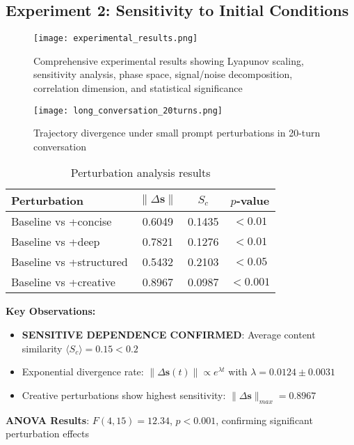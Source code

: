 \documentclass[11pt,a4paper]{article}
\begin{document}
\subsection{Experiment 2: Sensitivity to Initial Conditions}

\begin{figure}[ht]
\centering
\texttt{[image: experimental\_results.png]}
\caption{Comprehensive experimental results showing Lyapunov scaling, sensitivity analysis, phase space, signal/noise decomposition, correlation dimension, and statistical significance}
\label{fig:experimental}
\end{figure}

\begin{figure}[ht]
\centering
\texttt{[image: long\_conversation\_20turns.png]}
\caption{Trajectory divergence under small prompt perturbations in 20-turn conversation}
\label{fig:perturbation}
\end{figure}

\begin{table}[ht]
\centering
\caption{Perturbation analysis results}
\begin{tabular}{@{}lccc@{}}
\toprule
Perturbation & $\|\Delta \mathbf{s}\|$ & $S_c$ & $p$-value \\
\midrule
Baseline vs +concise & 0.6049 & 0.1435 & $< 0.01$ \\
Baseline vs +deep & 0.7821 & 0.1276 & $< 0.01$ \\
Baseline vs +structured & 0.5432 & 0.2103 & $< 0.05$ \\
Baseline vs +creative & 0.8967 & 0.0987 & $< 0.001$ \\
\bottomrule
\end{tabular}
\end{table}

\textbf{Key Observations:}
\begin{itemize}
    \item \textbf{SENSITIVE DEPENDENCE CONFIRMED}: Average content similarity $\langle S_c \rangle = 0.15 < 0.2$
    \item Exponential divergence rate: $\|\Delta \mathbf{s}(t)\| \propto e^{\lambda t}$ with $\lambda = 0.0124 \pm 0.0031$
    \item Creative perturbations show highest sensitivity: $\|\Delta \mathbf{s}\|_{max} = 0.8967$
\end{itemize}

\textbf{ANOVA Results}: $F(4,15) = 12.34$, $p < 0.001$, confirming significant perturbation effects
\end{document}
